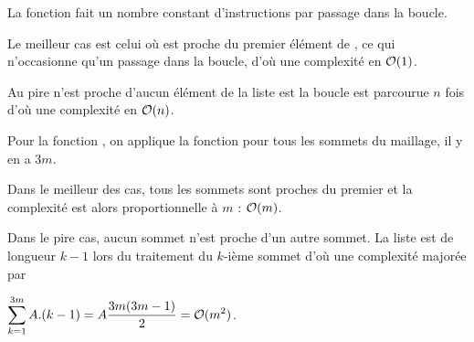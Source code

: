 \begin{Answer}
La fonction  fait un nombre constant d'instructions par passage dans la boucle.

Le meilleur cas est celui où  est proche du premier élément de , ce qui n'occasionne qu'un passage dans la boucle, d'où une complexité en ${\cal O}(1)$.

Au pire  n'est proche d'aucun élément de la liste est la boucle est parcourue $n$ fois d'où une complexité en ${\cal O}(n)$.

\medskip

Pour la fonction  , on applique  la fonction  pour tous les sommets du maillage, il y en a $3m$.

Dans le meilleur des cas, tous les sommets sont proches du premier et la complexité est alors proportionnelle à $m$ : ${\cal O}(m)$.


Dans le pire cas, aucun sommet n'est proche d'un autre sommet. La liste  est de longueur $k-1$ lors du traitement du $k$-ième sommet d'où une complexité majorée par 

$\displaystyle \sum_{k=1}^{3m} A.(k-1) = A\frac{3m(3m-1)}2 = 
{\cal O}(m^2)$.
\end{Answer}




